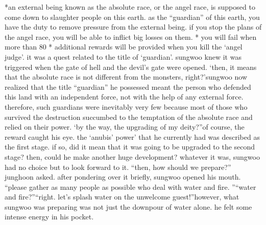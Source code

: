 *an external being known as the absolute race, or the angel race, is supposed to come down to slaughter people on this earth.
 as the “guardian” of this earth, you have the duty to remove pressure from the external being.
 if you stop the plans of the angel race, you will be able to inflict big losses on them.
* you will fail when more than 80%
* additional rewards will be provided when you kill the ‘angel judge’.
it was a quest related to the title of ‘guardian’.
 sungwoo knew it was triggered when the gate of hell and the devil’s gate were opened.
‘then, it means that the absolute race is not different from the monsters, right?’sungwoo now realized that the title “guardian” he possessed meant the person who defended this land with an independent force, not with the help of any external force.
therefore, such guardians were inevitably very few because most of those who survived the destruction succumbed to the temptation of the absolute race and relied on their power.
‘by the way, the upgrading of my deity?”of course, the reward caught his eye.
 the ‘anubis’ power’ that he currently had was described as the first stage.
 if so, did it mean that it was going to be upgraded to the second stage? then, could he make another huge development? whatever it was, sungwoo had no choice but to look forward to it.
“then, how should we prepare?” junghoon asked.
after pondering over it briefly, sungwoo opened his mouth.
“please gather as many people as possible who deal with water and fire.
”“water and fire?”“right.
 let’s splash water on the unwelcome guest!”however, what sungwoo was preparing was not just the downpour of water alone.
he felt some intense energy in his pocket.


 